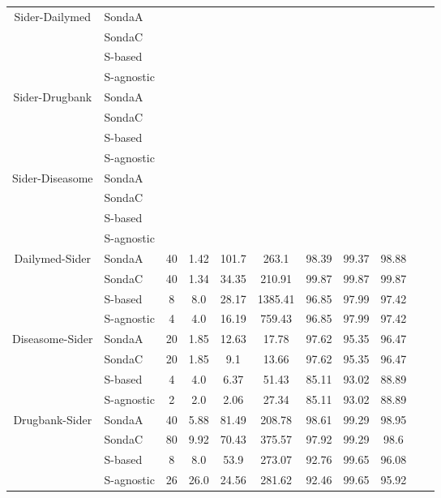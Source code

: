 \begin{center}
\begin{table*}[h]
\begin{tabular}{|c|l|c|c|c|c|c|c|c|c|c|}
\multirow{4}{*}{Sider-Dailymed} & SondaA     \\
											& SondaC  \\
											& S-based  \\
 											& S-agnostic        \\ \hline 		
 																							
\multirow{4}{*}{Sider-Drugbank} & SondaA     \\
											& SondaC  \\
											& S-based \\
 											& S-agnostic      \\ \hline 											

\multirow{4}{*}{Sider-Diseasome} & SondaA      \\
											& SondaC  \\
											& S-based   \\
 											& S-agnostic         \\ \hline 		 									

\multirow{4}{*}{Dailymed-Sider} & SondaA    & 40 & 1.42   & 101.7  & 263.1   & 98.39 & 99.37 & 98.88  \\
											& SondaC  & 40 & 1.34   & 34.35  & 210.91  & 99.87 & 99.87 & 99.87 \\
											& S-based    & 8 & 8.0   & 28.17  & 1385.41  & 96.85 & 97.99 & 97.42\\
 											& S-agnostic    & 4 & 4.0   & 16.19  & 759.43    & 96.85 & 97.99 & 97.42  \\ \hline 		

\multirow{4}{*}{Diseasome-Sider} & SondaA    & 20 & 1.85   & 12.63  & 17.78   & 97.62 & 95.35 & 96.47  \\
											& SondaC   & 20 & 1.85   & 9.1  & 13.66   & 97.62 & 95.35 & 96.47 \\
											& S-based  & 4 & 4.0   & 6.37  & 51.43   & 85.11 & 93.02 & 88.89 \\
 											& S-agnostic    & 2 & 2.0   & 2.06  & 27.34   & 85.11 & 93.02 & 88.89  \\ \hline 		 									

\multirow{4}{*}{Drugbank-Sider} & SondaA    & 40 & 5.88   & 81.49  & 208.78    & 98.61 & 99.29 & 98.95 \\
											& SondaC	   & 80 & 9.92   & 70.43  & 375.57  & 97.92 & 99.29 & 98.6 \\
											& S-based     & 8 & 8.0   & 53.9  & 273.07  & 92.76 & 99.65 & 96.08\\
 											& S-agnostic   & 26 & 26.0   & 24.56  & 281.62   & 92.46 & 99.65 & 95.92 \\ \hline 											 


\end{tabular}
\end{table*}
\end{center}

